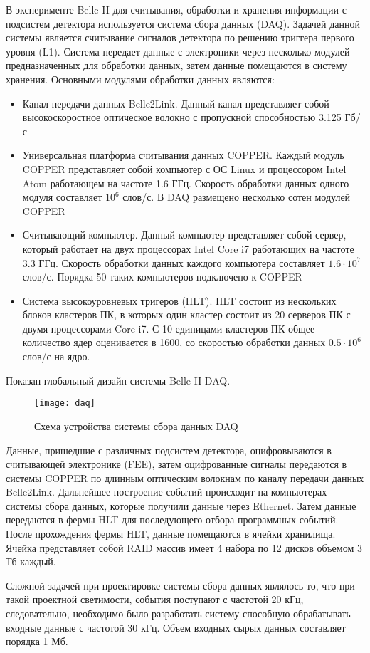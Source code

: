 В эксперименте Belle II для считывания, обработки и хранения информации с подсистем детектора используется система сбора данных (DAQ). Задачей данной системы является считывание сигналов детектора по решению триггера первого уровня (L1). Система передает данные с электроники через несколько модулей предназначенных для обработки данных, затем данные помещаются в систему хранения. Основными модулями обработки данных являются:
\begin{itemize}
  \item Канал передачи данных Belle2Link. Данный канал представляет собой высокоскоростное оптическое волокно с пропускной способностью 3.125 Гб/с
  \item Универсальная платформа считывания данных COPPER. Каждый модуль COPPER представляет собой компьютер с ОС Linux и процессором Intel Atom работающем на частоте 1.6 ГГц. Скорость обработки данных одного модуля составляет $10^6$ слов/с. В DAQ размещено несколько сотен модулей COPPER
  \item Считывающий компьютер. Данный компьютер представляет собой сервер, который  работает на двух процессорах Intel Core i7 работающих на частоте 3.3 ГГц. Скорость обработки данных каждого компьютера составляет $1.6\cdot10^7$ слов/с. Порядка 50 таких компьютеров подключено к COPPER
  \item Система высокоуровневых тригеров (HLT). HLT состоит из нескольких блоков кластеров ПК, в которых один кластер состоит из 20 серверов ПК с двумя процессорами Core i7. С 10 единицами кластеров ПК общее количество ядер оценивается в 1600, со скоростью обработки данных $0.5\cdot10^6$ слов/с на ядро.
\end{itemize}
Показан глобальный дизайн системы Belle II DAQ. 
\begin{figure}[htp]
  \centering
  \texttt{[image: daq]}
  \caption{Схема устройства системы сбора данных DAQ}
  \label{fig:galaxy}
\end{figure}
Данные, пришедшие с различных подсистем детектора, оцифровываются в считывающей электронике (FEE), затем оцифрованные сигналы передаются в системы COPPER по длинным оптическим волокнам по каналу передачи данных Belle2Link. Дальнейшее построение событий происходит на компьютерах системы сбора данных, которые получили данные через Ethernet. Затем данные передаются в фермы HLT для последующего отбора программных событий. После прохождения фермы HLT, данные помещаются в ячейки хранилища. Ячейка представляет собой RAID массив имеет 4 набора по 12 дисков объемом 3 Тб каждый. \par
  Сложной задачей при проектировке системы сбора данных являлось то, что при такой проектной светимости, события поступают с частотой 20 кГц, следовательно, необходимо было разработать систему способную обрабатывать входные данные с частотой 30 кГц. Объем входных сырых данных составляет порядка 1 Мб.
